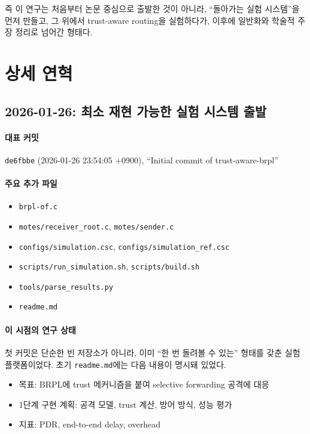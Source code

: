 \documentclass[12pt,a4paper]{article}
\begin{document}
즉 이 연구는 처음부터 논문 중심으로 출발한 것이 아니라,
``돌아가는 실험 시스템''을 먼저 만들고, 그 위에서 trust-aware routing을
실험하다가, 이후에 일반화와 학술적 주장 정리로 넘어간 형태다.

\section{상세 연혁}

\subsection{2026-01-26: 최소 재현 가능한 실험 시스템 출발}

\paragraph{대표 커밋}
\texttt{de6fbbe} (2026-01-26 23:54:05 +0900), ``Initial commit of trust-aware-brpl''

\paragraph{주요 추가 파일}
\begin{itemize}[leftmargin=1.5em]
\item \texttt{brpl-of.c}
\item \texttt{motes/receiver\_root.c}, \texttt{motes/sender.c}
\item \texttt{configs/simulation.csc}, \texttt{configs/simulation\_ref.csc}
\item \texttt{scripts/run\_simulation.sh}, \texttt{scripts/build.sh}
\item \texttt{tools/parse\_results.py}
\item \texttt{readme.md}
\end{itemize}

\paragraph{이 시점의 연구 상태}
첫 커밋은 단순한 빈 저장소가 아니라, 이미 ``한 번 돌려볼 수 있는'' 형태를 갖춘
실험 플랫폼이었다. 초기 \texttt{readme.md}에는 다음 내용이 명시돼 있었다.

\begin{itemize}[leftmargin=1.5em]
\item 목표: BRPL에 trust 메커니즘을 붙여 selective forwarding 공격에 대응
\item 1단계 구현 계획: 공격 모델, trust 계산, 방어 방식, 성능 평가
\item 지표: PDR, end-to-end delay, overhead
\end{itemize}
\end{document}
